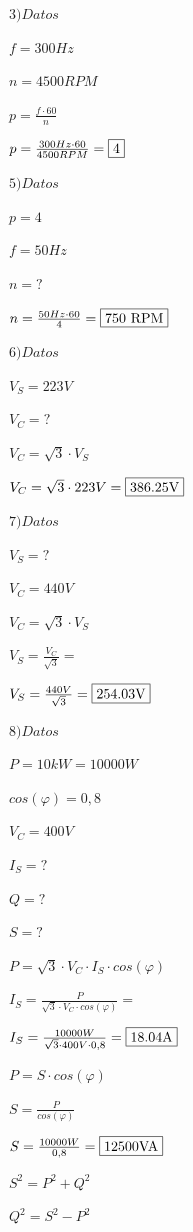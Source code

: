 $3)Datos$

$f=300Hz$

$n=4500RPM$

$p=\frac{f\cdot 60}{n}$

$p=\frac{300Hz\cdot 60}{4500RPM}=\fbox{4}$

\vspace{1cm}

$5)Datos$

$p=4$

$f=50Hz$

$n=?$

$n= \frac{50Hz\cdot 60}{4}=\fbox{750 RPM} $

\vspace{1cm}

$6) Datos$

$V_S=223V$

$V_C=?$

$V_C=\sqrt{3} \cdot V_S$

$V_C=\sqrt{3} \cdot 223V=\fbox{386.25V}$

\vspace{1cm}

$7) Datos$

$V_S=?$

$V_C=440V$

$V_C=\sqrt{3} \cdot V_S$

$V_S=\frac{V_C}{\sqrt{3}}=$

$V_S=\frac{440V}{\sqrt{3}}=\fbox{254.03V}$

\vspace{1cm}

$8) Datos$

$P=10kW=10000W$

$cos(\varphi)=0,8$

$V_C=400V$

$I_S=?$

$Q=?$

$S=?$

$P=\sqrt{3}\cdot V_C \cdot I_S \cdot cos(\varphi)$

$I_S=\frac{P}{\sqrt{3}\cdot V_C \cdot cos(\varphi)}=$

$I_S=\frac{10000W}{\sqrt{3}\cdot 400V \cdot 0,8}= \fbox{18.04A}$

$P=S \cdot cos(\varphi)$

$S=\frac{P} { cos(\varphi)}$

$S=\frac{10000W} {0,8}=\fbox{12500VA}$

$S^2=P^2+Q^2$

$Q^2=S^2-P^2$


